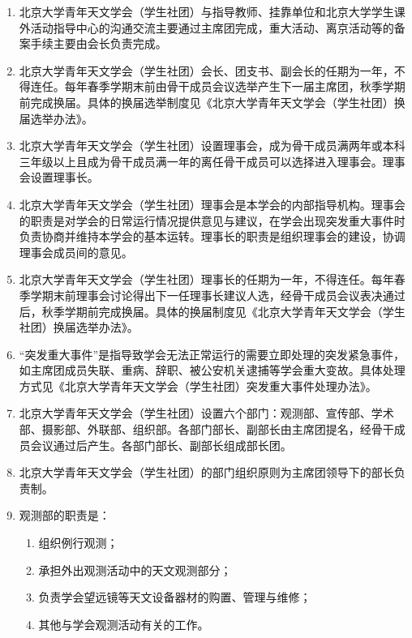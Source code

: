 \begin{enumerate}[resume]
    \item 北京大学青年天文学会（学生社团）与指导教师、挂靠单位和北京大学学生课外活动指导中心的沟通交流主要通过主席团完成，重大活动、离京活动等的备案手续主要由会长负责完成。
    
    \item 北京大学青年天文学会（学生社团）会长、团支书、副会长的任期为一年，不得连任。每年春季学期末前由骨干成员会议选举产生下一届主席团，秋季学期前完成换届。具体的换届选举制度见《北京大学青年天文学会（学生社团）换届选举办法》。
    
    \item 北京大学青年天文学会（学生社团）设置理事会，成为骨干成员满两年或本科三年级以上且成为骨干成员满一年的离任骨干成员可以选择进入理事会。理事会设置理事长。
    
    \item 北京大学青年天文学会（学生社团）理事会是本学会的内部指导机构。理事会的职责是对学会的日常运行情况提供意见与建议，在学会出现突发重大事件时负责协商并维持本学会的基本运转。理事长的职责是组织理事会的建设，协调理事会成员间的意见。
    
    \item 北京大学青年天文学会（学生社团）理事长的任期为一年，不得连任。每年春季学期末前理事会讨论得出下一任理事长建议人选，经骨干成员会议表决通过后，秋季学期前完成换届。具体的换届制度见《北京大学青年天文学会（学生社团）换届选举办法》。
    
    \item “突发重大事件”是指导致学会无法正常运行的需要立即处理的突发紧急事件，如主席团成员失联、重病、辞职、被公安机关逮捕等学会重大变故。具体处理方式见《北京大学青年天文学会（学生社团）突发重大事件处理办法》。
    
    \item 北京大学青年天文学会（学生社团）设置六个部门：观测部、宣传部、学术部、摄影部、外联部、组织部。各部门部长、副部长由主席团提名，经骨干成员会议通过后产生。各部门部长、副部长组成部长团。
    
    \item 北京大学青年天文学会（学生社团）的部门组织原则为主席团领导下的部长负责制。
    
    \item 观测部的职责是：
    
    \begin{enumerate}
        \item 组织例行观测；
        \item 承担外出观测活动中的天文观测部分；
        \item 负责学会望远镜等天文设备器材的购置、管理与维修；
        \item 其他与学会观测活动有关的工作。
    \end{enumerate}
    

\end{enumerate}
